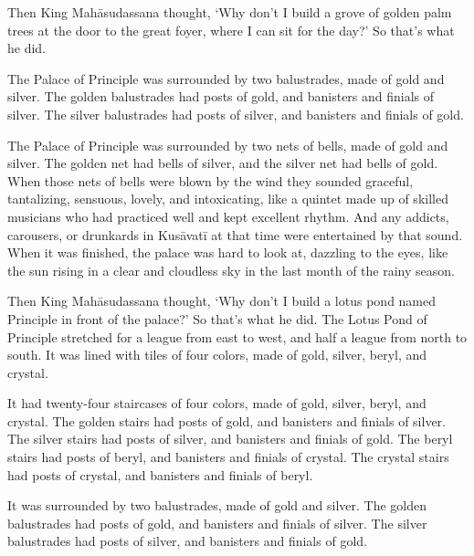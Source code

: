 \documentclass[12pt,openany]{book}%
\begin{document}
Then King \textsanskrit{Mahāsudassana} thought, ‘Why don’t I build a grove of golden palm trees at the door to the great foyer, where I can sit for the day?’ So that’s what he did. 

The Palace of Principle was surrounded by two balustrades, made of gold and silver. The golden balustrades had posts of gold, and banisters and finials of silver. The silver balustrades had posts of silver, and banisters and finials of gold. 

The Palace of Principle was surrounded by two nets of bells, made of gold and silver. The golden net had bells of silver, and the silver net had bells of gold. When those nets of bells were blown by the wind they sounded graceful, tantalizing, sensuous, lovely, and intoxicating, like a quintet made up of skilled musicians who had practiced well and kept excellent rhythm. And any addicts, carousers, or drunkards in \textsanskrit{Kusāvatī} at that time were entertained by that sound. When it was finished, the palace was hard to look at, dazzling to the eyes, like the sun rising in a clear and cloudless sky in the last month of the rainy season. 

Then King \textsanskrit{Mahāsudassana} thought, ‘Why don’t I build a lotus pond named Principle in front of the palace?’ So that’s what he did. The Lotus Pond of Principle stretched for a league from east to west, and half a league from north to south. It was lined with tiles of four colors, made of gold, silver, beryl, and crystal. 

It had twenty-four staircases of four colors, made of gold, silver, beryl, and crystal. The golden stairs had posts of gold, and banisters and finials of silver. The silver stairs had posts of silver, and banisters and finials of gold. The beryl stairs had posts of beryl, and banisters and finials of crystal. The crystal stairs had posts of crystal, and banisters and finials of beryl. 

It was surrounded by two balustrades, made of gold and silver. The golden balustrades had posts of gold, and banisters and finials of silver. The silver balustrades had posts of silver, and banisters and finials of gold. 
\end{document}
